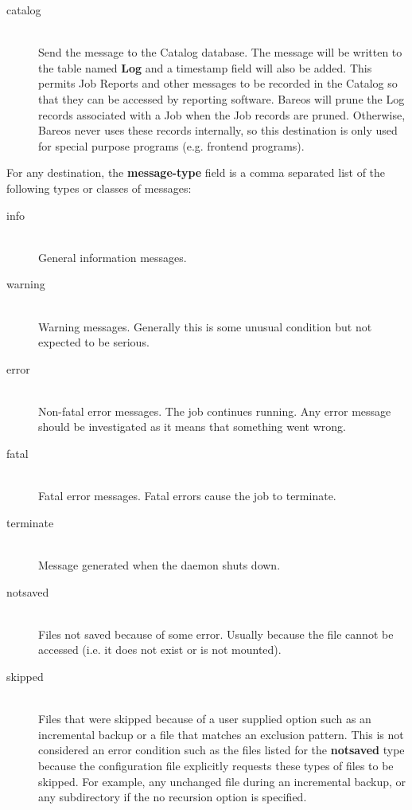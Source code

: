 \begin{description}
\begin{description}
\item [catalog] \hfill \\
Send the message to the Catalog database. The message will be
written to the table named {\bf Log} and a timestamp field will
also be added. This permits Job Reports and other messages to
be recorded in the Catalog so that they can be accessed by
reporting software.  Bareos will prune the Log records associated
with a Job when the Job records are pruned.  Otherwise, Bareos
never uses these records internally, so this destination is only
used for special purpose programs (e.g. frontend programs).

\end{description}

For any destination, the {\bf message-type} field is a comma separated
list of the following types or classes of messages:

\begin{description}

\item [info] \hfill \\
General information messages.

\item [warning] \hfill \\
Warning messages. Generally this is some  unusual condition but not expected
to be serious.

\item [error] \hfill \\
Non-fatal error messages. The job continues running.  Any error message should
be investigated as it means that something  went wrong.

\item [fatal] \hfill \\
Fatal error messages. Fatal errors cause the  job to terminate.

\item [terminate] \hfill \\
Message generated when the daemon shuts down.

\item [notsaved] \hfill \\
Files not saved because of some error.  Usually because the file cannot be
accessed (i.e. it does not  exist or is not mounted).

\item [skipped] \hfill \\
Files that were skipped because of a user supplied option such as an
incremental backup or a file that matches an exclusion pattern.  This is
not considered an error condition such as the files listed for the {\bf
notsaved} type because the configuration file explicitly requests these
types of files to be skipped.  For example, any unchanged file during an
incremental backup, or any subdirectory if the no recursion option is
specified.


\end{description}
\end{description}
